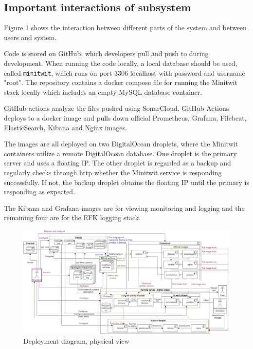 \subsection{Important interactions of subsystem}
\hyperref[fig:componentDiagram]{Figure \ref{fig:communicationDiagram}} shows the interaction between different parts of the system and between users and system.

Code is stored on GitHub, which developers pull and push to during development. When running the code locally, a local database should be used, called \texttt{minitwit}, which runs on port 3306 localhost with password and username "root". The repository contains a docker compose file for running the Minitwit stack locally which includes an empty MySQL database container.

GitHub actions analyze the files pushed using SonarCloud. GitHub Actions deploys to a docker image and pulls down official Prometheus, Grafana, Filebeat, ElasticSearch, Kibana and Nginx images.

The images are all deployed on two DigitalOcean droplets, where the Minitwit containers utilize a remote DigitalOcean database. One droplet is the primary server and uses a floating IP. The other droplet is regarded as a backup and regularly checks through http whether the Minitwit service is responding successfully. If not, the backup droplet obtains the floating IP until the primary is responding as expected. 

The Kibana and Grafana images are for viewing monitoring and logging and the remaining four are for the EFK logging stack.

\begin{figure}[H]
    \centering
    \hspace*{-0.7in}
    \includegraphics[scale=0.3]{images/Diagrams-Physical_view_deployment_diagram.jpg}
    \caption{Deployment diagram, physical view}
    \label{fig:communicationDiagram}
\end{figure}


